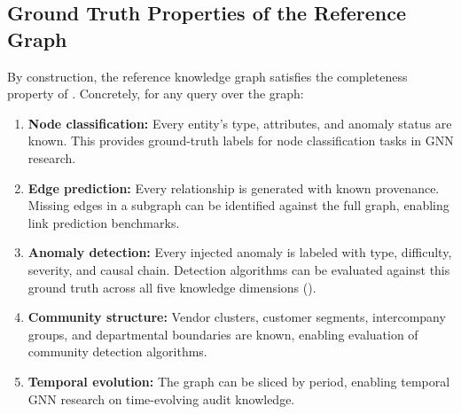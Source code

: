 \subsection{Ground Truth Properties of the Reference Graph}
\label{sec:kg_ground_truth}

By construction, the reference knowledge graph satisfies the
completeness property of .  Concretely, for any
query over the graph:

\begin{enumerate}
  \item \textbf{Node classification:} Every entity's type, attributes,
    and anomaly status are known.  This provides ground-truth labels for
    node classification tasks in GNN research.
  \item \textbf{Edge prediction:} Every relationship is generated with
    known provenance.  Missing edges in a subgraph can be identified
    against the full graph, enabling link prediction benchmarks.
  \item \textbf{Anomaly detection:} Every injected anomaly is labeled
    with type, difficulty, severity, and causal chain.  Detection
    algorithms can be evaluated against this ground truth across all
    five knowledge dimensions ().
  \item \textbf{Community structure:} Vendor clusters, customer
    segments, intercompany groups, and departmental boundaries are known,
    enabling evaluation of community detection algorithms.
  \item \textbf{Temporal evolution:} The graph can be sliced by period,
    enabling temporal GNN research on time-evolving audit knowledge.
\end{enumerate}
